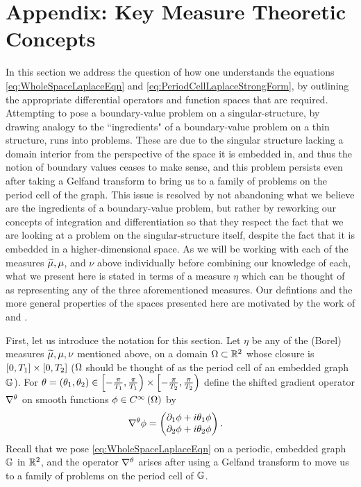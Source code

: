 \section{Appendix: Key Measure Theoretic Concepts} \label{app:MeasureTheory}
In this section we address the question of how one understands the equations \eqref{eq:WholeSpaceLaplaceEqn} and \eqref{eq:PeriodCellLaplaceStrongForm}, by outlining the appropriate differential operators and function spaces that are required.
Attempting to pose a boundary-value problem on a singular-structure, by drawing analogy to the ``ingredients" of a boundary-value problem on a thin structure, runs into problems.
These are due to the singular structure lacking a domain interior from the perspective of the space it is embedded in, and thus the notion of boundary values ceases to make sense, and this problem persists even after taking a Gelfand transform to bring us to a family of problems on the period cell of the graph.
This issue is resolved by not abandoning what we believe are the ingredients of a boundary-value problem, but rather by reworking our concepts of integration and differentiation so that they respect the fact that we are looking at a problem on the singular-structure itself, despite the fact that it is embedded in a higher-dimensional space.
As we will be working with each of the measures $\widetilde{\mu}, \mu$, and $\nu$ above individually before combining our knowledge of each, what we present here is stated in terms of a measure $\eta$ which can be thought of as representing any of the three aforementioned measures.
Our defintions and the more general properties of the spaces presented here are motivated by the work of \cite{zhikov2000extension} and \cite{zhikov2002homogenization}. \newline

First, let us introduce the notation for this section.
Let $\eta$ be any of the (Borel) measures $\widetilde{\mu},\mu,\nu$ mentioned above, on a domain $\Omega\subset\mathbb{R}^2$ whose closure is $\left[ 0,T_1 \right]\times\left[ 0,T_2 \right]$ ($\Omega$ should be thought of as the period cell of an embedded graph $\mathbb{G}$).
For $\theta=\left( \theta_1,\theta_2 \right)\in\left[-\frac{\pi}{T_1},\frac{\pi}{T_1}\right)\times\left[-\frac{\pi}{T_2},\frac{\pi}{T_2}\right)$ define the shifted gradient operator $\nabla^{\theta}$ on smooth functions $\phi\in C^{\infty}\left( \Omega \right)$ by
\begin{align*}
	\nabla^{\theta}\phi &= \begin{pmatrix} \partial_1\phi + i\theta_1\phi \\ \partial_2\phi + i\theta_2\phi \end{pmatrix}.
\end{align*}
Recall that we pose \eqref{eq:WholeSpaceLaplaceEqn} on a periodic, embedded graph $\mathbb{G}$ in $\mathbb{R}^2$, and the operator $\nabla^{\theta}$ arises after using a Gelfand transform to move us to a family of problems on the period cell of $\mathbb{G}$. \newline

